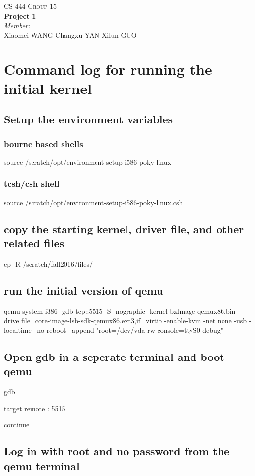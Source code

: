\documentclass[letterpaper,10pt]{article}
\begin{document}
\begin{center}
    \textsc{\LARGE CS 444 Group 15}\\
    { \huge \bfseries Project 1 \\}
    \emph{Member:}\\
    Xiaomei \textsc{WANG}
    Changxu \textsc{YAN}
    Xilun \textsc{GUO}
\end{center}


\section{Command log for running the initial kernel}
\subsection{Setup the environment variables}
\subsubsection{bourne based shells}
source /scratch/opt/environment-setup-i586-poky-linux
\subsubsection{tcsh/csh shell}
source /scratch/opt/environment-setup-i586-poky-linux.csh
\subsection{copy the starting kernel, driver file, and other related files}
cp -R /scratch/fall2016/files/ .
\subsection{run the initial version of qemu}
qemu-system-i386 -gdb tcp::5515 -S -nographic -kernel bzImage-qemux86.bin -drive file=core-image-lsb-sdk-qemux86.ext3,if=virtio -enable-kvm -net none -usb -localtime --no-reboot --append "root=/dev/vda rw console=ttyS0 debug"
\subsection{Open gdb in a seperate terminal and boot qemu}
gdb

target remote : 5515

continue
\subsection{Log in with root and no password from the qemu terminal}
\end{document}
